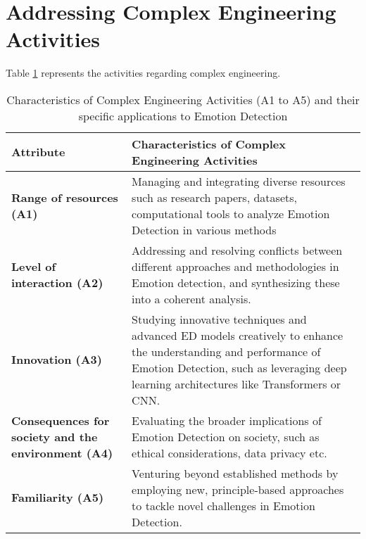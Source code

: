 \documentclass[12pt]{article} %
\begin{document}
\section{Addressing Complex Engineering Activities}
Table \ref{tab:complex_activities_nlp} represents the activities regarding complex engineering.
\begin{table}[htbp]
    \centering
    \caption{Characteristics of Complex Engineering Activities (A1 to A5) and their specific applications to Emotion Detection}
    \label{tab:complex_activities_nlp}
    \begin{tabular}{|>{\centering\arraybackslash}m{4cm}|>{\raggedright\arraybackslash}m{10cm}|}
        \hline
        \textbf{Attribute} & \textbf{Characteristics of Complex Engineering Activities} \\
        \hline
        \textbf{Range of resources (A1)} &  Managing and integrating diverse resources such as research papers, datasets, computational tools to analyze Emotion Detection in various methods \\
        \hline
        \textbf{Level of interaction (A2)} & Addressing and resolving conflicts between different approaches and methodologies in Emotion detection, and synthesizing these into a coherent analysis. \\
        \hline
        \textbf{Innovation (A3)} & Studying innovative techniques and advanced ED models creatively to enhance the understanding and performance of Emotion Detection, such as leveraging deep learning architectures like Transformers or CNN. \\
        \hline
        \textbf{Consequences for society and the environment (A4)} & Evaluating the broader implications of Emotion Detection on society, such as ethical considerations, data privacy etc. \\                    
  
        \hline
        \textbf{Familiarity (A5)} &  Venturing beyond established methods by employing new, principle-based approaches to tackle novel challenges in Emotion Detection. \\
        \hline
    \end{tabular}
    
\end{table}
\end{document}
